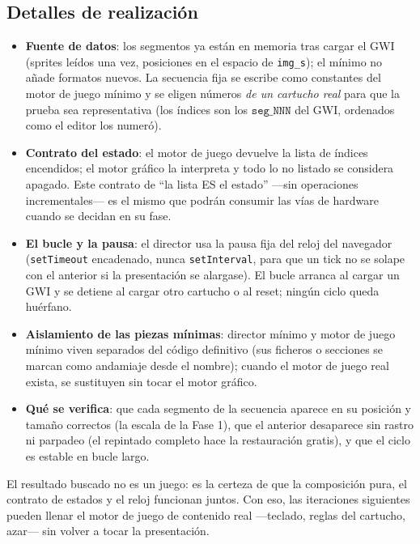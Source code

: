 \subsection{Detalles de realización}
\label{subsec:DetallesRealización}

\begin{itemize}
	\item \textbf{Fuente de datos}: los segmentos ya están en memoria tras cargar el GWI (sprites leídos una vez, posiciones en el espacio de \texttt{img\_s}); el mínimo no añade formatos nuevos. La secuencia fija se escribe como constantes del motor de juego mínimo y se eligen números \emph{de un cartucho real} para que la prueba sea representativa (los índices son los $\texttt{seg\_NNN}$ del GWI, ordenados como el editor los numeró).
	\item \textbf{Contrato del estado}: el motor de juego devuelve la lista de índices encendidos; el motor gráfico la interpreta y todo lo no listado se considera apagado. Este contrato de ``la lista ES el estado'' ---sin operaciones incrementales--- es el mismo que podrán consumir las vías de hardware cuando se decidan en su fase.
	\item \textbf{El bucle y la pausa}: el director usa la pausa fija del reloj del navegador (\texttt{setTimeout} encadenado, nunca \texttt{setInterval}, para que un tick no se solape con el anterior si la presentación se alargase). El bucle arranca al cargar un GWI y se detiene al cargar otro cartucho o al reset; ningún ciclo queda huérfano.
	\item \textbf{Aislamiento de las piezas mínimas}: director mínimo y motor de juego mínimo viven separados del código definitivo (sus ficheros o secciones se marcan como andamiaje desde el nombre); cuando el motor de juego real exista, se sustituyen sin tocar el motor gráfico.
	\item \textbf{Qué se verifica}: que cada segmento de la secuencia aparece en su posición y tamaño correctos (la escala de la Fase 1), que el anterior desaparece sin rastro ni parpadeo (el repintado completo hace la restauración gratis), y que el ciclo es estable en bucle largo.
\end{itemize}

El resultado buscado no es un juego: es la certeza de que la composición pura, el contrato de estados y el reloj funcionan juntos. Con eso, las iteraciones siguientes pueden llenar el motor de juego de contenido real ---teclado, reglas del cartucho, azar--- sin volver a tocar la presentación.

\clearpage